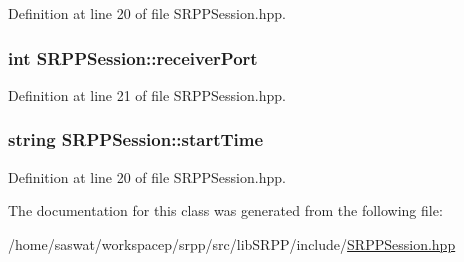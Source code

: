 Definition at line 20 of file SRPPSession.hpp.

\hypertarget{class_s_r_p_p_session_ae6981a0780fccbb981b3dc70a4e0d42b}{
\subsubsection[{receiverPort}]{\setlength{\rightskip}{0pt plus 5cm}int {\bf SRPPSession::receiverPort}}}
\label{class_s_r_p_p_session_ae6981a0780fccbb981b3dc70a4e0d42b}


Definition at line 21 of file SRPPSession.hpp.

\hypertarget{class_s_r_p_p_session_aae9df6b95bbcba60df75ac36f377218c}{
\subsubsection[{startTime}]{\setlength{\rightskip}{0pt plus 5cm}string {\bf SRPPSession::startTime}}}
\label{class_s_r_p_p_session_aae9df6b95bbcba60df75ac36f377218c}


Definition at line 20 of file SRPPSession.hpp.



The documentation for this class was generated from the following file:\begin{DoxyCompactItemize}
\item 
/home/saswat/workspacep/srpp/src/libSRPP/include/\hyperlink{_s_r_p_p_session_8hpp}{SRPPSession.hpp}\end{DoxyCompactItemize}
